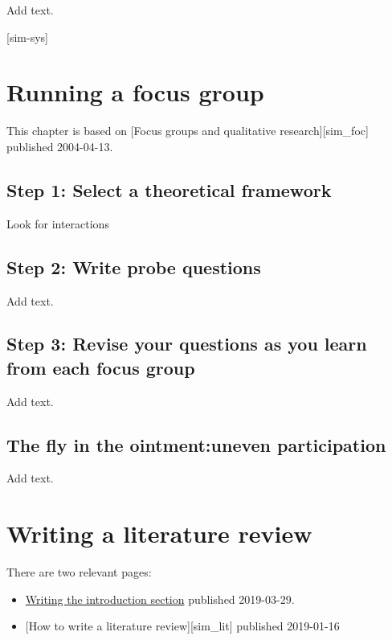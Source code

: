 \documentclass[
  letterpaper,
  DIV=11,
  numbers=noendperiod]{scrreprt}
\providecommand{\tightlist}{%
  \setlength{\itemsep}{0pt}\setlength{\parskip}{0pt}}\usepackage{longtable,booktabs,array}
\begin{document}
Add text.

{[}sim-sys{]}


\chapter{Running a focus group}\label{running-a-focus-group}

This chapter is based on {[}Focus groups and qualitative
research{]}{[}sim\_foc{]} published 2004-04-13.

\section{Step 1: Select a theoretical
framework}\label{step-1-select-a-theoretical-framework}

Look for interactions

\section{Step 2: Write probe
questions}\label{step-2-write-probe-questions}

Add text.

\section{Step 3: Revise your questions as you learn from each focus
group}\label{step-3-revise-your-questions-as-you-learn-from-each-focus-group}

Add text.

\section{The fly in the ointment:uneven
participation}\label{the-fly-in-the-ointmentuneven-participation}

Add text.


\chapter{Writing a literature review}\label{writing-a-literature-review}

There are two relevant pages:

\begin{itemize}
\tightlist
\item
  \href{http://new.pmean.com/writing-methods-section/}{Writing the
  introduction section} published 2019-03-29.
\item
  {[}How to write a literature review{]}{[}sim\_lit{]} published
  2019-01-16
\end{itemize}
\end{document}
